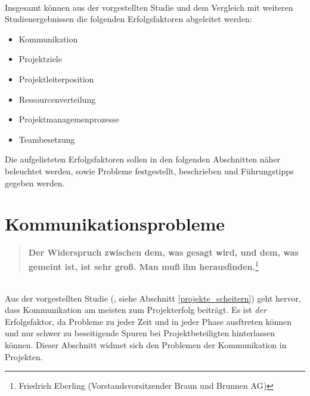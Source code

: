 \documentclass[12pt]{scrartcl}
\begin{document}
\\
Insgesamt können aus der vorgestellten Studie und dem Vergleich mit weiteren Studienergebnissen die folgenden Erfolgsfaktoren abgeleitet werden:
\begin{itemize}
    \item{Kommunikation}
    \item{Projektziele}
    \item{Projektleiterposition}
    \item{Ressourcenverteilung}
    \item{Projektmanagemenprozesse}
    \item{Teambesetzung}
\end{itemize}
Die aufgelisteten Erfolgsfaktoren sollen in den folgenden Abschnitten näher beleuchtet werden, sowie Probleme festgestellt, beschrieben und Führungstipps gegeben werden.
\pagebreak
\section{Kommunikationsprobleme}
\label{kommunikationsprobleme}
\begin{quote}
\colorbox{blue!5}{\textbf{Der Widerspruch zwischen dem, was gesagt wird, und dem, was gemeint ist, ist sehr groß. Man muß ihn herausfinden.}}\footnote{Friedrich Eberling (Vorstandsvorsitzender Braun und Brunnen AG)}
\end{quote}
\ \\
Aus der vorgestellten Studie (\cite{GPM_Studie_2008}, siehe Abschnitt \ref{projekte_scheitern}) geht hervor, dass Kommunikation am meisten zum Projekterfolg beiträgt. Es ist \textit{der} Erfolgsfaktor, da Probleme zu jeder Zeit und in jeder Phase ausftreten können und nur schwer zu beseitigende Spuren bei Projektbeteiligten hinterlassen können. Dieser Abschnitt widmet sich den Problemen der Kommunikation in Projekten.

\end{document}
